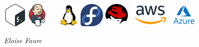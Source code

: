\documentclass[]{friggeri-cv}
\begin{document}
\begin{bottom}
\includegraphics[height=12mm]{logo/bash-logo.png} \qquad \qquad %
\includegraphics[height=12mm]{logo/jenkins-logo.png} \qquad  \qquad  %
~
~
\qquad \qquad%
\includegraphics[height=12mm]{logo/linux-logo.png} \qquad \qquad \qquad  %
\includegraphics[height=12mm]{logo/fedora-logo.png} \qquad \qquad \qquad %
\includegraphics[height=12mm]{logo/redhat-logo.png} \qquad \qquad  \qquad%
\includegraphics[height=12mm]{logo/aws-logo.png}\qquad\qquad  \qquad %
\includegraphics[height=12mm]{logo/azure-logo.png} 
~ %
\begin{flushleft} %
	\emph{Eloise Faure} %
\end{flushleft} %
\end{bottom}
\end{document}
